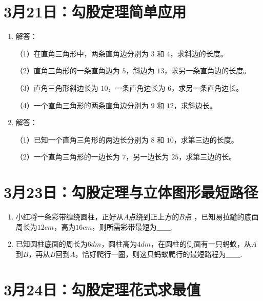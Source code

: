 \section*{3月21日：勾股定理简单应用}


\begin{enumerate}
\item 解答：

（1）在直角三角形中，两条直角边分别为 $3$ 和 $4$，求斜边的长度。

（2）直角三角形的一条直角边为 $5$，斜边为 $13$，求另一条直角边的长度。

（3）直角三角形斜边长为 $10$，一条直角边长为 $6$，求另一条直角边长。

（4）一个直角三角形的两条直角边分别为 $9$ 和 $12$，求斜边长。

\item 解答：

（1）已知一个直角三角形的两边长分别为 $8$ 和 $10$，求第三边的长度。

（2）一个直角三角形的一边长为 $7$，另一边长为 $25$，求第三边的长。
\end{enumerate}






\section*{3月23日：勾股定理与立体图形最短路径}

\begin{enumerate}
\item 小红将一条彩带缠绕圆柱，正好从$A$点绕到正上方的$B$点
，已知易拉罐的底面周长为$12cm$，高为$16cm$，则所需彩带最短为$\_\_\_\_\_\_.$
\item 已知圆柱底面的周长为$6dm$，圆柱高为$4dm$，在圆柱的侧面有一只蚂蚁，从$A$到$B$，再从$B$回到$A$，恰好爬行一圈，则这只蚂蚁爬行的最短路程为$\_\_\_\_\_\_.$
\end{enumerate}


\newpage

\section*{3月24日：勾股定理花式求最值}